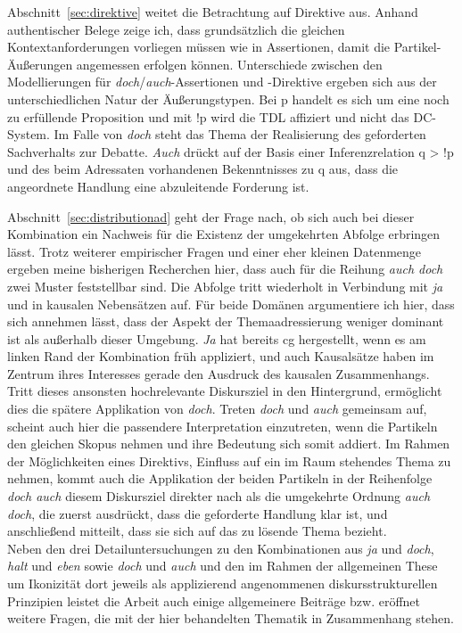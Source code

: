 Abschnitt~\ref{sec:direktive} weitet die Betrachtung auf Direktive  aus. Anhand authentischer Belege zeige ich, dass grundsätzlich die gleichen Kontextanforderungen vorliegen müssen wie in Assertionen, damit die Partikel-Äußerungen angemessen erfolgen können. Unterschiede zwischen den Modellierungen für \textit{doch}/\textit{auch}-Asser\-tionen und -Direktive ergeben sich aus der unterschiedlichen Natur der Äuße\-rungstypen. Bei p handelt es sich um eine noch zu erfüllende Proposition und mit !p wird die TDL affiziert und nicht das DC-System. Im Falle von \textit{doch} steht das Thema der Realisierung des geforderten Sachverhalts zur Debatte. \textit{Auch} drückt auf der Basis einer  Inferenzrelation q > !p und des beim Adressaten vorhandenen Bekennt\-nisses zu q aus, dass die angeordnete Handlung eine abzuleitende Forderung ist. 

Abschnitt~\ref{sec:distributionad} geht der Frage nach, ob sich auch bei dieser Kombination ein Nachweis für die Existenz der umgekehrten Abfolge erbringen lässt. Trotz weiterer empirischer Fragen und einer eher kleinen Datenmenge ergeben meine bisherigen Recherchen hier, dass auch für die Reihung \textit{auch doch} zwei Muster feststellbar sind. Die Abfolge tritt wiederholt in Verbindung mit \textit{ja} und in kausalen Nebensätzen auf. Für beide Domänen argumentiere ich hier, dass sich annehmen lässt, dass der Aspekt der Themaadressierung weniger dominant ist als außerhalb dieser Umgebung. \textit{Ja} hat bereits cg hergestellt, wenn es am linken Rand der Kombination früh appliziert, und auch Kausalsätze haben im Zentrum ihres Interesses gerade den Ausdruck des kausalen Zusammenhangs. Tritt dieses ansonsten hochrelevante Diskursziel in den Hintergrund, ermöglicht dies die spätere Ap\-plikation von \textit{doch}. Treten \textit{doch} und \textit{auch} gemeinsam auf, scheint auch hier die passendere Interpretation einzutreten, wenn die Partikeln den gleichen Skopus  nehmen und ihre Bedeutung sich somit addiert. Im Rahmen der Möglichkeiten eines Direktivs, Einfluss auf ein im Raum stehendes Thema zu nehmen, kommt auch die Applikation der beiden Partikeln in der Reihenfolge \textit{doch auch} diesem Diskursziel direkter nach als die umgekehrte Ordnung \textit{auch doch}, die zuerst ausdrückt, dass die geforderte Handlung klar ist, und anschließend mitteilt, dass sie sich auf das zu lösende Thema bezieht.\\

\noindent
Neben den drei Detailuntersuchungen zu den Kombinationen aus \textit{ja} und \textit{doch}, \textit{halt} und \textit{eben} sowie \textit{doch} und \textit{auch} und den im Rahmen der allgemeinen These um Ikonizität dort jeweils als applizierend angenommenen diskursstrukturellen Prinzipien leistet die Arbeit auch einige allgemeinere Beiträge bzw. eröffnet wei\-tere Fragen, die mit der hier behandelten Thematik in Zusammenhang stehen.\\

